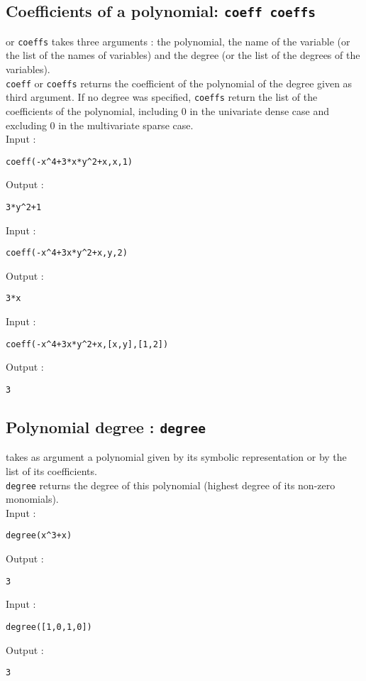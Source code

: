 \documentclass[a4paper,11pt]{book}
\begin{document}
\subsection{Coefficients of a polynomial: {\tt coeff coeffs}}
 or {\tt coeffs} takes three arguments : the polynomial, 
the name of the variable (or the list of the names of  variables) and
the degree (or the list of the degrees of the variables).\\
{\tt coeff} or {\tt coeffs} returns the coefficient of the polynomial
of the degree given as third argument. 
If no degree was specified, {\tt coeffs} return
the list of the coefficients of the polynomial, including 0 in the
univariate dense case and excluding 0 in the multivariate sparse case.\\
Input :
\begin{center}{\tt coeff(-x\verb|^|4+3*x*y\verb|^|2+x,x,1)}\end{center}
Output :
\begin{center}{\tt 3*y\verb|^|2+1}\end{center}  
Input :
\begin{center}{\tt coeff(-x\verb|^|4+3x*y\verb|^|2+x,y,2)}\end{center}
Output :
\begin{center}{\tt 3*x}\end{center} 
Input :
\begin{center}{\tt coeff(-x\verb|^|4+3x*y\verb|^|2+x,[x,y],[1,2])}\end{center}
Output :
\begin{center}{\tt 3}\end{center} 

\subsection{Polynomial degree : {\tt degree}}
 takes as argument a polynomial given by its symbolic 
representation or by the list of its coefficients.\\
{\tt degree} returns the degree of this polynomial (highest
degree of its non-zero monomials).\\ 
Input :
\begin{center}{\tt degree(x\verb|^|3+x)}\end{center}
Output :
\begin{center}{\tt 3}\end{center} 
Input :
\begin{center}{\tt degree([1,0,1,0])}\end{center}
Output :
\begin{center}{\tt 3}\end{center}
\end{document}
